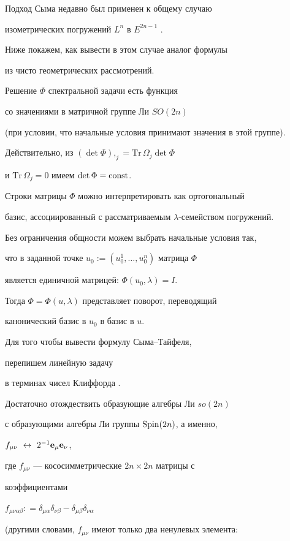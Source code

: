 Подход Сыма недавно был применен к общему случаю


изометрических погружений $L^n$ в $E^{2n-1}$ \cite{Ci-space}.


Ниже покажем, как вывести в этом случае аналог формулы


 из чисто геометрических рассмотрений.


Решение $\Phi$ спектральной задачи  есть функция


со значениями в матричной группе Ли $SO(2n)$


(при условии, что начальные условия принимают значения в этой группе).


Действительно, из $(\det\Phi),_j = \mathrm{Tr}\,\Omega_j \det\Phi$


и $\mathrm{Tr}\,\Omega_j = 0$ имеем $\det\Phi = \operatorname{const}$.


Строки матрицы $\Phi$ можно интерпретировать как ортогональный


базис, ассоциированный с рассматриваемым $\lambda$-семейством погружений.


Без ограничения общности можем выбрать начальные условия так,


что в заданной точке $u_0 :=(u_0^1,\dotsc,u_0^n)$ матрица $\Phi$


является единичной матрицей: $\Phi(u_0,\lambda)=I$.


Тогда $\Phi=\Phi(u,\lambda)$ представляет поворот, переводящий


канонический базис в $u_0$ в базис в $u$.


Для того чтобы вывести формулу Сыма--Тайфеля,


перепишем линейную задачу 


в терминах чисел Клиффорда \cite{Ci-space}.


Достаточно отождествить образующие алгебры Ли $so(2n)$


с образующими алгебры Ли группы $\operatorname{Spin}(2n)$, а именно,


$f_{\mu \nu} \ \leftrightarrow \ 2^{-1} \bold e_\mu \bold e_\nu$,


где $f_{\mu \nu}$ --- кососимметрические $2n\times 2n$ матрицы с


коэффициентами


$f_{\mu \nu \alpha \beta}: = \delta_{\mu \alpha} \delta_{\nu \beta} -


\delta_{\mu \beta} \delta_{\nu \alpha}$


(другими словами, $f_{\mu\nu}$ имеют только два ненулевых элемента:


